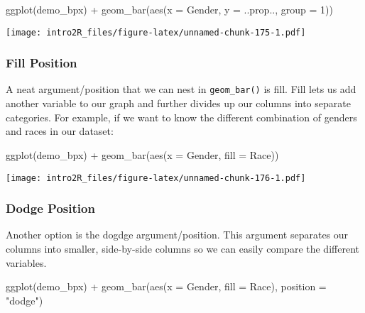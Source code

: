 \documentclass[
]{book}
\newenvironment{Shaded}{\begin{snugshade}}{\end{snugshade}}
\newcommand{\AttributeTok}[1]{\textcolor[rgb]{0.77,0.63,0.00}{#1}}
\newcommand{\DecValTok}[1]{\textcolor[rgb]{0.00,0.00,0.81}{#1}}
\newcommand{\FunctionTok}[1]{\textcolor[rgb]{0.00,0.00,0.00}{#1}}
\newcommand{\NormalTok}[1]{#1}
\newcommand{\SpecialCharTok}[1]{\textcolor[rgb]{0.00,0.00,0.00}{#1}}
\newcommand{\StringTok}[1]{\textcolor[rgb]{0.31,0.60,0.02}{#1}}
\begin{document}
\begin{Shaded}
\begin{Highlighting}[]
\FunctionTok{ggplot}\NormalTok{(demo\_bpx) }\SpecialCharTok{+}
    \FunctionTok{geom\_bar}\NormalTok{(}\FunctionTok{aes}\NormalTok{(}\AttributeTok{x =}\NormalTok{ Gender, }\AttributeTok{y =}\NormalTok{ ..prop.., }\AttributeTok{group =} \DecValTok{1}\NormalTok{))}
\end{Highlighting}
\end{Shaded}

\texttt{[image: intro2R\_files/figure-latex/unnamed-chunk-175-1.pdf]}

\hypertarget{fill-position}{%
\subsubsection{Fill Position}\label{fill-position}}

A neat argument/position that we can nest in \texttt{geom\_bar()} is fill. Fill lets us add another variable to our graph and further divides up our columns into separate categories. For example, if we want to know the different combination of genders and races in our dataset:

\begin{Shaded}
\begin{Highlighting}[]
\FunctionTok{ggplot}\NormalTok{(demo\_bpx) }\SpecialCharTok{+}
    \FunctionTok{geom\_bar}\NormalTok{(}\FunctionTok{aes}\NormalTok{(}\AttributeTok{x =}\NormalTok{ Gender, }\AttributeTok{fill =}\NormalTok{ Race))}
\end{Highlighting}
\end{Shaded}

\texttt{[image: intro2R\_files/figure-latex/unnamed-chunk-176-1.pdf]}

\hypertarget{dodge-position}{%
\subsubsection{Dodge Position}\label{dodge-position}}

Another option is the dogdge argument/position. This argument separates our columns into smaller, side-by-side columns so we can easily compare the different variables.

\begin{Shaded}
\begin{Highlighting}[]
\FunctionTok{ggplot}\NormalTok{(demo\_bpx) }\SpecialCharTok{+}
  \FunctionTok{geom\_bar}\NormalTok{(}\FunctionTok{aes}\NormalTok{(}\AttributeTok{x =}\NormalTok{ Gender, }\AttributeTok{fill =}\NormalTok{ Race), }
           \AttributeTok{position =} \StringTok{"dodge"}\NormalTok{)}
\end{Highlighting}
\end{Shaded}
\end{document}
